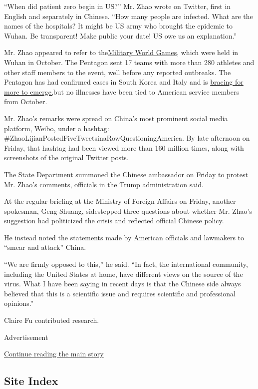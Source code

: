``When did patient zero begin in US?'' Mr. Zhao wrote on Twitter, first
in English and separately in Chinese. ``How many people are infected.
What are the names of the hospitals? It might be US army who brought the
epidemic to Wuhan. Be transparent! Make public your date! US owe us an
explanation.''

Mr. Zhao appeared to refer to
the\href{https://www.defense.gov/Explore/Spotlight/CISM-Military-World-Games/}{Military
World Games}, which were held in Wuhan in October. The Pentagon sent 17
teams with more than 280 athletes and other staff members to the event,
well before any reported outbreaks. The Pentagon has had confirmed cases
in South Korea and Italy and is
\href{https://www.nytimes3xbfgragh.onion/2020/03/12/us/politics/military-virus-pentagon.html}{bracing
for more to emerge,}but no illnesses have been tied to American service
members from October.

Mr. Zhao's remarks were spread on China's most prominent social media
platform, Weibo, under a hashtag:
\#ZhaoLijianPostedFiveTweetsinaRowQuestioningAmerica. By late afternoon
on Friday, that hashtag had been viewed more than 160 million times,
along with screenshots of the original Twitter posts.

The State Department summoned the Chinese ambassador on Friday to
protest Mr. Zhao's comments, officials in the Trump administration said.

At the regular briefing at the Ministry of Foreign Affairs on Friday,
another spokesman, Geng Shuang, sidestepped three questions about
whether Mr. Zhao's suggestion had politicized the crisis and reflected
official Chinese policy.

He instead noted the statements made by American officials and lawmakers
to ``smear and attack'' China.

``We are firmly opposed to this,'' he said. ``In fact, the international
community, including the United States at home, have different views on
the source of the virus. What I have been saying in recent days is that
the Chinese side always believed that this is a scientific issue and
requires scientific and professional opinions.''

Claire Fu contributed research.

Advertisement

\protect\hyperlink{after-bottom}{Continue reading the main story}

\hypertarget{site-index}{%
\subsection{Site Index}\label{site-index}}

